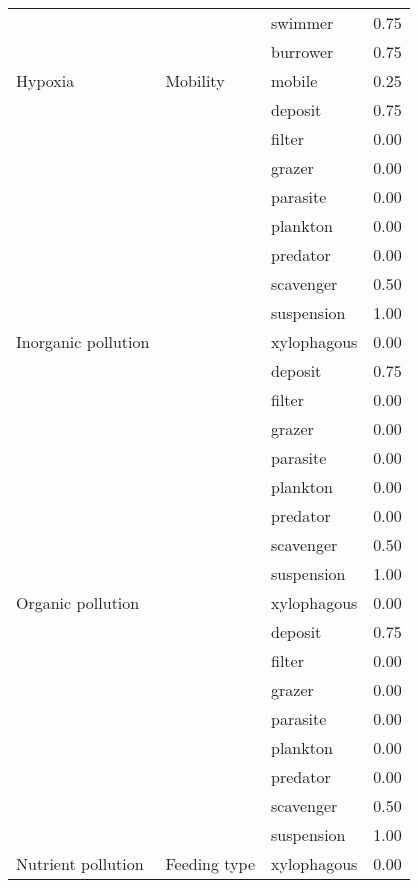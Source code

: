 \documentclass[
  12pt,
]{article}
\begin{document}
\begin{longtable}{llll}
\cmidrule{3-4}
 &  & swimmer & 0.75\\
\cmidrule{3-4}
 &  & burrower & 0.75\\
\cmidrule{3-4}
\multirow{-11}{*}{\raggedright\arraybackslash Hypoxia} & \multirow{-5}{*}{\raggedright\arraybackslash Mobility} & mobile & 0.25\\
\cmidrule{1-4}
 &  & deposit & 0.75\\
\cmidrule{3-4}
 &  & filter & 0.00\\
\cmidrule{3-4}
 &  & grazer & 0.00\\
\cmidrule{3-4}
 &  & parasite & 0.00\\
\cmidrule{3-4}
 &  & plankton & 0.00\\
\cmidrule{3-4}
 &  & predator & 0.00\\
\cmidrule{3-4}
 &  & scavenger & 0.50\\
\cmidrule{3-4}
 &  & suspension & 1.00\\
\cmidrule{3-4}
\multirow{-9}{*}{\raggedright\arraybackslash Inorganic pollution} &  & xylophagous & 0.00\\
\cmidrule{1-1}
\cmidrule{3-4}
 &  & deposit & 0.75\\
\cmidrule{3-4}
 &  & filter & 0.00\\
\cmidrule{3-4}
 &  & grazer & 0.00\\
\cmidrule{3-4}
 &  & parasite & 0.00\\
\cmidrule{3-4}
 &  & plankton & 0.00\\
\cmidrule{3-4}
 &  & predator & 0.00\\
\cmidrule{3-4}
 &  & scavenger & 0.50\\
\cmidrule{3-4}
 &  & suspension & 1.00\\
\cmidrule{3-4}
\multirow{-9}{*}{\raggedright\arraybackslash Organic pollution} &  & xylophagous & 0.00\\
\cmidrule{1-1}
\cmidrule{3-4}
 &  & deposit & 0.75\\
\cmidrule{3-4}
 &  & filter & 0.00\\
\cmidrule{3-4}
 &  & grazer & 0.00\\
\cmidrule{3-4}
 &  & parasite & 0.00\\
\cmidrule{3-4}
 &  & plankton & 0.00\\
\cmidrule{3-4}
 &  & predator & 0.00\\
\cmidrule{3-4}
 &  & scavenger & 0.50\\
\cmidrule{3-4}
 &  & suspension & 1.00\\
\cmidrule{3-4}
\multirow{-9}{*}{\raggedright\arraybackslash Nutrient pollution} & \multirow{-27}{*}{\raggedright\arraybackslash Feeding type} & xylophagous & 0.00\\

\end{longtable}
\end{document}
